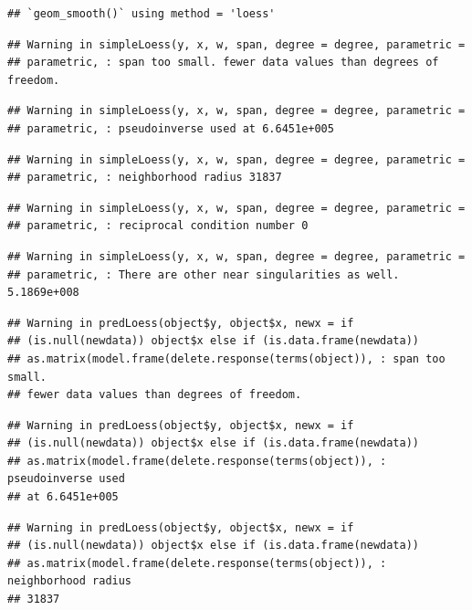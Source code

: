 \documentclass[]{article}
\begin{document}
\begin{verbatim}
## `geom_smooth()` using method = 'loess'
\end{verbatim}

\begin{verbatim}
## Warning in simpleLoess(y, x, w, span, degree = degree, parametric =
## parametric, : span too small. fewer data values than degrees of freedom.
\end{verbatim}

\begin{verbatim}
## Warning in simpleLoess(y, x, w, span, degree = degree, parametric =
## parametric, : pseudoinverse used at 6.6451e+005
\end{verbatim}

\begin{verbatim}
## Warning in simpleLoess(y, x, w, span, degree = degree, parametric =
## parametric, : neighborhood radius 31837
\end{verbatim}

\begin{verbatim}
## Warning in simpleLoess(y, x, w, span, degree = degree, parametric =
## parametric, : reciprocal condition number 0
\end{verbatim}

\begin{verbatim}
## Warning in simpleLoess(y, x, w, span, degree = degree, parametric =
## parametric, : There are other near singularities as well. 5.1869e+008
\end{verbatim}

\begin{verbatim}
## Warning in predLoess(object$y, object$x, newx = if
## (is.null(newdata)) object$x else if (is.data.frame(newdata))
## as.matrix(model.frame(delete.response(terms(object)), : span too small.
## fewer data values than degrees of freedom.
\end{verbatim}

\begin{verbatim}
## Warning in predLoess(object$y, object$x, newx = if
## (is.null(newdata)) object$x else if (is.data.frame(newdata))
## as.matrix(model.frame(delete.response(terms(object)), : pseudoinverse used
## at 6.6451e+005
\end{verbatim}

\begin{verbatim}
## Warning in predLoess(object$y, object$x, newx = if
## (is.null(newdata)) object$x else if (is.data.frame(newdata))
## as.matrix(model.frame(delete.response(terms(object)), : neighborhood radius
## 31837
\end{verbatim}
\end{document}
